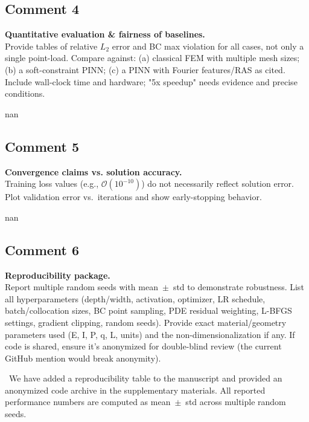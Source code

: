 \documentclass{ar2rc}
\begin{document}
	\subsection{Comment 4}
	\RC\textbf{Quantitative evaluation \& fairness of baselines.}\\
    Provide tables of relative $L_2$ error and BC max violation for all cases, not only a single point-load. Compare against: (a) classical FEM with multiple mesh sizes; (b) a soft-constraint PINN; (c) a PINN with Fourier features/RAS as cited. Include wall-clock time and hardware; "5x speedup" needs evidence and precise conditions.

	\AR nan

	\subsection{Comment 5}
	\RC\textbf{Convergence claims vs. solution accuracy.}\\
    Training loss values (e.g., $\mathcal{O}(10^{-10})$) do not necessarily reflect solution error. Plot validation error vs.\ iterations and show early-stopping behavior.

	\AR	nan

	\subsection{Comment 6}
	\RC\textbf{Reproducibility package.}\\
    Report multiple random seeds with mean~$\pm$~std to demonstrate robustness. List all hyperparameters (depth/width, activation, optimizer, LR schedule, batch/collocation sizes, BC point sampling, PDE residual weighting, L-BFGS settings, gradient clipping, random seeds). Provide exact material/geometry parameters used (E, I, P, q, L, units) and the non-dimensionalization if any. If code is shared, ensure it's anonymized for double-blind review (the current GitHub mention would break anonymity).
    
	\AR\ We have added a reproducibility table to the manuscript and provided an anonymized code archive in the supplementary materials. All reported performance numbers are computed as mean~$\pm$~std across multiple random seeds.
  

\end{document}
